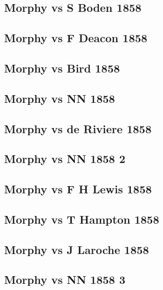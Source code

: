 \documentclass[]{book}
\begin{document}
\subsection{Morphy vs S Boden 1858}\label{morphy-vs-s-boden-1858}

\subsection{Morphy vs F Deacon 1858}\label{morphy-vs-f-deacon-1858}

\subsection{Morphy vs Bird 1858}\label{morphy-vs-bird-1858}

\subsection{Morphy vs NN 1858}\label{morphy-vs-nn-1858}

\subsection{Morphy vs de Riviere 1858}\label{morphy-vs-de-riviere-1858}

\subsection{Morphy vs NN 1858 2}\label{morphy-vs-nn-1858-2}

\subsection{Morphy vs F H Lewis 1858}\label{morphy-vs-f-h-lewis-1858}

\subsection{Morphy vs T Hampton 1858}\label{morphy-vs-t-hampton-1858}

\subsection{Morphy vs J Laroche 1858}\label{morphy-vs-j-laroche-1858}

\subsection{Morphy vs NN 1858 3}\label{morphy-vs-nn-1858-3}
\end{document}
